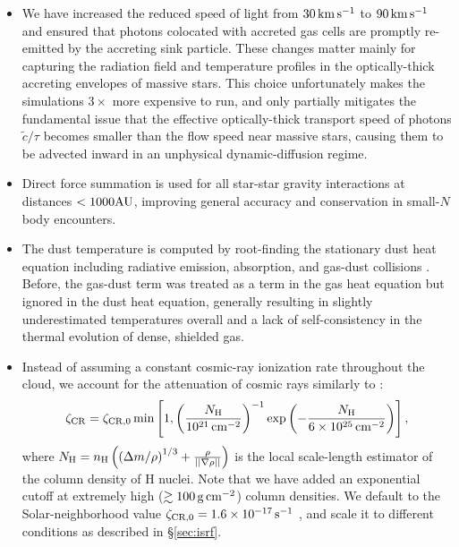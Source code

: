 \documentclass[apjl,twocolumn]{openjournal}
\begin{document}
\begin{itemize}
\item We have increased the reduced speed of light from $30\,\rm km\,s^{-1}$ to $90\,\rm km\,s^{-1}$ and ensured that photons colocated with accreted gas cells are promptly re-emitted by the accreting sink particle. These changes matter mainly for capturing the radiation field and temperature profiles in the optically-thick accreting envelopes of massive stars. This choice unfortunately makes the simulations $3 \times$ more expensive to run, and only partially mitigates the fundamental issue that the effective optically-thick transport speed of photons $\tilde{c}/\tau$ becomes smaller than the flow speed near massive stars, causing them to be advected inward in an unphysical dynamic-diffusion regime.
\item Direct force summation is used for all star-star gravity interactions at distances $<1000 \rm AU$, improving general accuracy and conservation in small-$N$ body encounters.
\item The dust temperature is computed by root-finding the stationary dust heat equation including radiative emission, absorption, and gas-dust collisions \citep{hollenbach:1979.molecule.formation.shocks}. Before, the gas-dust term was treated as a term in the gas heat equation but ignored in the dust heat equation, generally resulting in slightly underestimated temperatures overall and a lack of self-consistency in the thermal evolution of dense, shielded gas.
\item Instead of assuming a constant cosmic-ray ionization rate throughout the cloud, we account for the attenuation of cosmic rays similarly to \citet{kim:2022.athena.ism.physics}:
\begin{equation}
\zeta_{\rm CR} = \zeta_{\rm CR,0}\min\left[1, \left(\frac{N_{\rm H}}{10^{21}\,\rm cm^{-2}}\right)^{-1} \exp\left(-\frac{N_{\rm H}}{6 \times 10^{25}\,\rm cm^{-2}}\right)\right],
\end{equation}
where $N_{\rm H}=n_{\rm H} \left(\left(\Delta m/\rho\right)^{1/3} + \frac{\rho}{|| \nabla \rho||} \right)$ is the local scale-length estimator of the column density of H nuclei. Note that we have added an exponential cutoff at extremely high ($\gtrsim 100\,\rm g\,\rm cm^{-2}$) column densities. We default to the Solar-neighborhood value $\zeta_{\rm CR,0}=1.6\times 10^{-17}\,\rm s^{-1}$ \citep{cummings:2016.cosmic.rays.voyager}, and scale it to different conditions as described in \S\ref{sec:isrf}.
\end{itemize}
\end{document}
